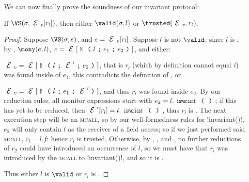 \setcounter{theorem}{0}\LS
We can now finally prove the soundness of our invariant protocol:
\SS
\begin{theorem}[Soundness]\rm
If $\VS(\s, \EV[r_l])$, then either $\valid(\s,l)$ or $\trusted(\EV,r_l)$.
\end{theorem}\SS
\begin{proof}
\noindent Suppose $\VS(\s, e)$, and $e = \EV[r_l]$. Suppose $l$ is not $\valid$; since $l$ is \reach, by , $\mony(e,l)$, $e = \E[\M{l}{e_1}{e_2}]$, and either:
\begin{iitemize}
	\item $\EV = \E[\M{l}{\E'}{e_2}]$, that is $r_l$ (which by definition cannot equal $l$) was found inside of $e_1$, this contradicts the definition of \mony, or
	\item $\EV = \E[\M{l}{e_1}{\E'}]$, and thus $r_l$ was found inside $e_2$. By our reduction rules, all monitor expressions start with $e_2=l.\invariant$; if this has yet to be reduced, then $\E'[r_l] = l.\invariant$, thus $r_l$ is \trusted. The next execution step will be an \textsc{mcall}, so by our well-formedness rules for \Q!invariant()!, $e_2$ will only contain $l$ as the receiver of a field access; so if we just performed said \textsc{mcall}, $r_l = l.f$: hence $r_l$ is trusted. Otherwise, by , , and \HNC, no further reductions of $e_2$ could have introduced an occurrence of $l$, so we must have that $r_l$ was introduced by the \textsc{mcall} to \Q!invariant()!, and so it is \trusted.
\end{iitemize}
Thus either $l$ is $\valid$ or $r_l$ is \trusted.
\end{proof}
